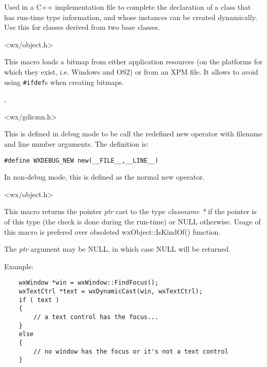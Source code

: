 Used in a C++ implementation file to complete the declaration of
a class that has run-time type information, and whose instances
can be created dynamically. Use this for classes derived from two
base classes.


<wx/object.h>

\label{wxbitmapmacro}


This macro loads a bitmap from either application resources (on the platforms
for which they exist, i.e. Windows and OS2) or from an XPM file. It allows to
avoid using {\tt \#ifdef}s when creating bitmaps.


, 


<wx/gdicmn.h>

\label{debugnew}


This is defined in debug mode to be call the redefined new operator
with filename and line number arguments. The definition is:

\begin{verbatim}
#define WXDEBUG_NEW new(__FILE__,__LINE__)
\end{verbatim}

In non-debug mode, this is defined as the normal new operator.


<wx/object.h>

\label{wxdynamiccast}


This macro returns the pointer {\it ptr} cast to the type {\it classname *} if
the pointer is of this type (the check is done during the run-time) or NULL
otherwise. Usage of this macro is prefered over obsoleted wxObject::IsKindOf()
function.

The {\it ptr} argument may be NULL, in which case NULL will be returned.

Example:

\begin{verbatim}
    wxWindow *win = wxWindow::FindFocus();
    wxTextCtrl *text = wxDynamicCast(win, wxTextCtrl);
    if ( text )
    {
        // a text control has the focus...
    }
    else
    {
        // no window has the focus or it's not a text control
    }
\end{verbatim}

